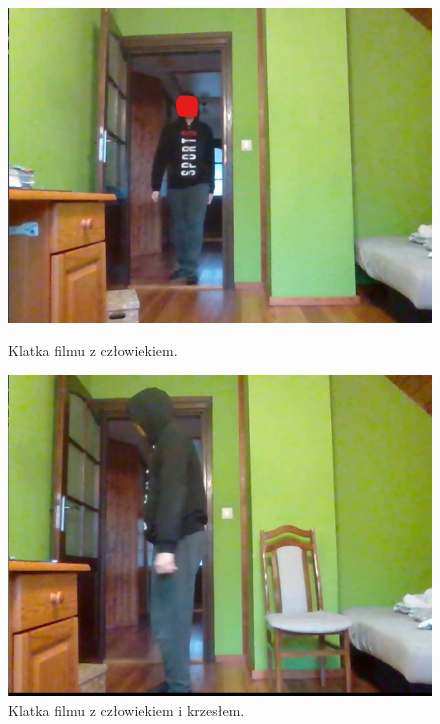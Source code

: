\begin{figure}[H]
    \centering
    \begin{minipage}{0.32\textwidth}
        \centering
        \includegraphics[width=\linewidth]{r_test_dokładności/vid_pics/1_2.png}
        \caption{Klatka filmu z człowiekiem.}
    \end{minipage}\hfill
    \begin{minipage}{0.32\textwidth}
        \centering
        \includegraphics[width=\linewidth]{r_test_dokładności/vid_pics/1c_2.png}
        \caption{Klatka filmu z człowiekiem i krzesłem.}
    \end{minipage}\hfill
    \begin{minipage}{0.32\textwidth}
        \centering

\end{minipage}
\end{figure}
